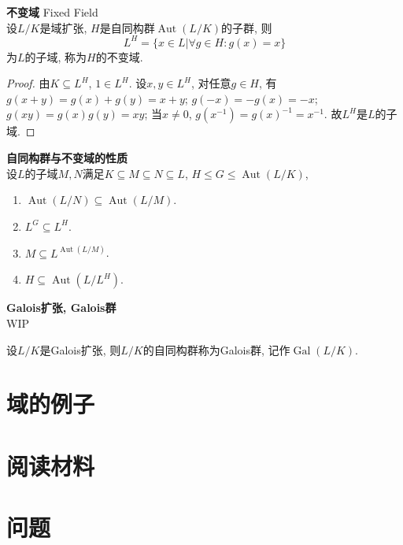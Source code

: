 \begin{pro}\textbf{不变域} Fixed Field\\
设$L/K$是域扩张, $H$是自同构群$\operatorname{Aut}(L/K)$的子群, 则
\begin{equation*}
    L^H = \{x \in L \vert \forall g\in H: g(x)=x\}
\end{equation*}
为$L$的子域, 称为$H$的不变域. 
\end{pro}
\begin{proof}
由$K\subseteq L^H$, $1\in L^H$. 设$x,y\in L^H$, 对任意$g\in H$, 有$g(x+y) = g(x) + g(y) = x+y$; $g(-x) = -g(x)=-x$; $g(xy) = g(x)g(y) = xy$; 当$x\neq 0$, $g(x^{-1}) = g(x)^{-1} = x^{-1}$. 故$L^H$是$L$的子域. 
\end{proof}

\begin{pro}\textbf{自同构群与不变域的性质}\\
设$L$的子域$M,N$满足$K\subseteq M \subseteq N\subseteq L$, $H \le G \le \operatorname{Aut}(L/K)$, 
\begin{enumerate}
\item $\operatorname{Aut}(L/N) \subseteq \operatorname{Aut}(L/M)$.
\item $L^G \subseteq L^H$.
\item $M\subseteq L^{\operatorname{Aut}(L/M)}$.
\item $H\subseteq \operatorname{Aut}(L/L^H)$.
\end{enumerate}
\end{pro}


\begin{dfn}\textbf{Galois扩张, Galois群}\\
WIP

设$L/K$是Galois扩张, 则$L/K$的自同构群称为Galois群, 记作$\operatorname{Gal}(L/K)$. 
\end{dfn}



\section{域的例子}

\section*{阅读材料}

\section*{问题}

